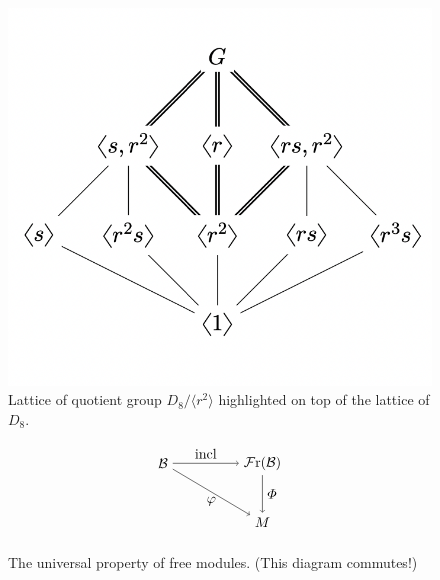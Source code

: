 \documentclass[11pt, reqno]{amsart}
\theoremstyle{plain}
\theoremstyle{definition}
\theoremstyle{example}
\def\<{\langle} \def\>{\rangle}
\def\Fr{\mathcal{F}\mathrm{r}}
\begin{document}
\begin{figure}[htbp]
	\centering 
	\includegraphics[scale=.5]{lattice}
	\caption{Lattice of quotient group $D_8 / \<r^2\>$ highlighted on top of the lattice of $D_8$.}
\end{figure}


\begin{figure}[htbp]
	\centering 
	$$\begin{tikzpicture}
		\node (B)   at (-1.25, 0)   {$\cB$};
		\node (FrB) at (1.25, 0)    {$\Fr(\cB)$};
		\node (M)   at (1.25, -1.5) {$M$};
			
		\draw[->] (B)   -- node[above] {incl}      (FrB);
		\draw[->] (FrB) -- node[right] {$\varPhi$} (M);
		\draw[->] (B)   -- node[below] {$\varphi$} (M);
	\end{tikzpicture}$$ 
	\caption{The universal property of free modules. (This diagram commutes!)}
\end{figure}
\end{document}
